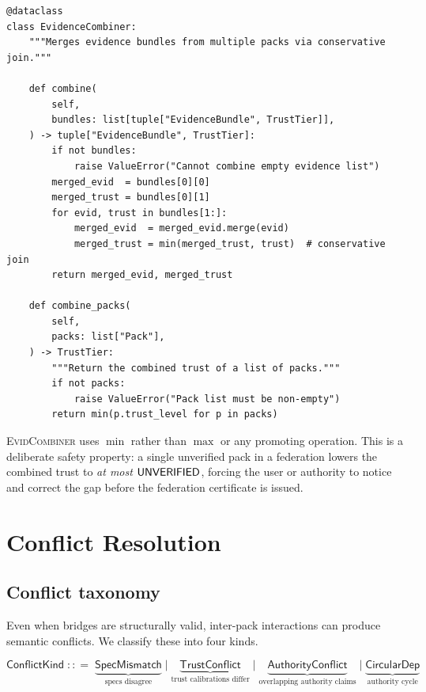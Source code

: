 \documentclass[11pt]{article}
\newcommand{\ConflK}{\ensuremath{\mathsf{ConflictKind}}}
\newcommand{\EC}{\textsc{EvidCombiner}}
\begin{document}
\begin{lstlisting}[style=jugeo-python, caption={\EC{} merging evidence across packs.}]
@dataclass
class EvidenceCombiner:
    """Merges evidence bundles from multiple packs via conservative join."""

    def combine(
        self,
        bundles: list[tuple["EvidenceBundle", TrustTier]],
    ) -> tuple["EvidenceBundle", TrustTier]:
        if not bundles:
            raise ValueError("Cannot combine empty evidence list")
        merged_evid  = bundles[0][0]
        merged_trust = bundles[0][1]
        for evid, trust in bundles[1:]:
            merged_evid  = merged_evid.merge(evid)
            merged_trust = min(merged_trust, trust)  # conservative join
        return merged_evid, merged_trust

    def combine_packs(
        self,
        packs: list["Pack"],
    ) -> TrustTier:
        """Return the combined trust of a list of packs."""
        if not packs:
            raise ValueError("Pack list must be non-empty")
        return min(p.trust_level for p in packs)
\end{lstlisting}

\begin{remark}
\EC{} uses $\min$ rather than $\max$ or any promoting operation.
This is a deliberate safety property: a single unverified pack in a
federation lowers the combined trust to \emph{at most} $\mathsf{UNVERIFIED}$,
forcing the user or authority to notice and correct the gap before
the federation certificate is issued.
\end{remark}

\section{Conflict Resolution}
\label{sec:conflicts}

\subsection{Conflict taxonomy}

Even when bridges are structurally valid, inter-pack interactions can
produce semantic conflicts.  We classify these into four kinds.

\begin{definition}[ConflictKind]
\label{def:conflict-kind}
\[
  \ConflK \;{:}{:}{=}\;
  \underbrace{\mathsf{SpecMismatch}}_{\text{specs disagree}}
  \mid
  \underbrace{\mathsf{TrustConflict}}_{\text{trust calibrations differ}}
  \mid
  \underbrace{\mathsf{AuthorityConflict}}_{\text{overlapping authority claims}}
  \mid
  \underbrace{\mathsf{CircularDep}}_{\text{authority cycle}}
\]
\end{definition}
\end{document}

